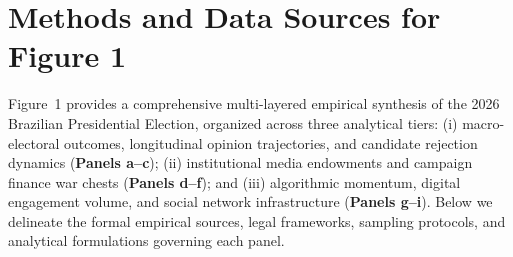 \section*{Methods and Data Sources for Figure 1}
\label{sec:figure1_methods}

Figure~1 provides a comprehensive multi-layered empirical synthesis of the 2026 Brazilian Presidential Election, organized across three analytical tiers: (i) macro-electoral outcomes, longitudinal opinion trajectories, and candidate rejection dynamics (\textbf{Panels a--c}); (ii) institutional media endowments and campaign finance war chests (\textbf{Panels d--f}); and (iii) algorithmic momentum, digital engagement volume, and social network infrastructure (\textbf{Panels g--i}). Below we delineate the formal empirical sources, legal frameworks, sampling protocols, and analytical formulations governing each panel.

